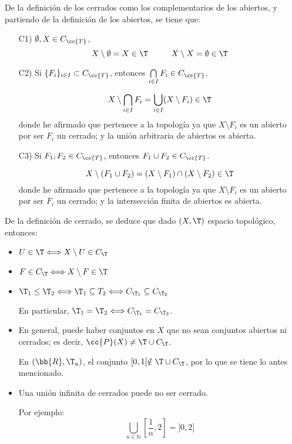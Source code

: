 De la definición de los cerrados como los complementarios de los abiertos, y partiendo de la definición de los abiertos, se tiene que:
\begin{enumerate}
    \item[C1)] $\emptyset, X\in C_{\cc{T}}$,
    $$X\setminus \emptyset = X\in \T \hspace{1cm} X\setminus X=\emptyset\in \T$$
    
    \item[C2)] Si $\{F_i\}_{i\in I}\subset C_{\cc{T}}$, entonces $\bigcap\limits_{i\in I}F_i\in C_{\cc{T}}$,

    \begin{equation*}
        X\setminus \bigcap\limits_{i\in I}F_i = \bigcup\limits_{i\in I}(X\setminus F_i) \in \T
    \end{equation*}
    donde he afirmado que pertenece a la topología ya que $X\setminus F_i$ es un abierto por ser $F_i$ un cerrado; y la unión arbitraria de abiertos es abierta.
    
    \item[C3)] Si $F_1,F_2\in C_{\cc{T}}$, entonces $F_1\cup F_2\in C_{\cc{T}}$.

    $$X\setminus (F_1\cup F_2) = (X\setminus F_1)\cap (X\setminus F_2)\in \T$$
    donde he afirmado que pertenece a la topología ya que $X\setminus F_i$ es un abierto por ser $F_i$ un cerrado; y la intersección finita de abiertos es abierta.
    
\end{enumerate}

De la definición de cerrado, se deduce que dado $(X,\T)$ espacio topológico, entonces:
\begin{itemize}
    \item $U\in \T\Longleftrightarrow X\setminus U\in C_\T$
    \item $F\in C_\T \Longleftrightarrow X\setminus F\in \T$
    \item $\T_1\leq \T_2 \Longleftrightarrow \T_1\subseteq T_2 \Longleftrightarrow C_{\T_1}\subseteq C_{\T_2}$

    En particular, $\T_1=\T_2\Longleftrightarrow C_{\T_1}=C_{\T_2}$.

    \item En general, puede haber conjuntos en $X$ que no sean conjuntos abiertos ni cerrados; es decir, $\cc{P}(X)\neq \T\cup C_\T$.

    En $(\bb{R},\T_u)$, el conjunto $[0,1[\notin \T\cup C_\T$, por lo que se tiene lo antes mencionado.

    \item Una unión infinita de cerrados puede no ser cerrado.

        Por ejemplo:
        \begin{equation*}
            \bigcup_{n\in \mathbb{N}} \left[\frac{1}{n}, 2\right] = ]0,2]
        \end{equation*}
\end{itemize}


